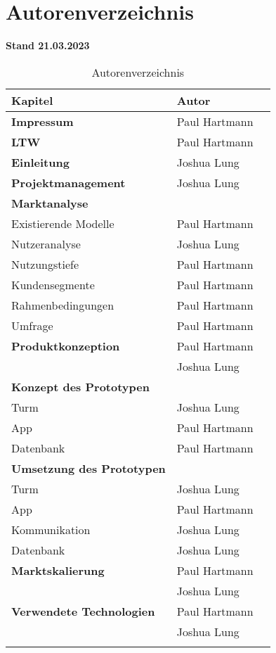 \section{Autorenverzeichnis}

\textbf{Stand 21.03.2023}

\begin{longtable}{llr}
  \textbf{Kapitel}                  & \textbf{Autor} \\
  \toprule
  \textbf{Impressum}                & Paul Hartmann  \\
  \midrule
  \textbf{LTW}                      & Paul Hartmann  \\
  \midrule
  \textbf{Einleitung}               & Joshua Lung    \\
  \midrule
  \textbf{Projektmanagement}        & Joshua Lung    \\
  \midrule
  \textbf{Marktanalyse}             &                \\
  Existierende Modelle              & Paul Hartmann  \\
  Nutzeranalyse                     & Joshua Lung    \\
  Nutzungstiefe                     & Paul Hartmann  \\
  Kundensegmente                    & Paul Hartmann  \\
  Rahmenbedingungen                 & Paul Hartmann  \\
  Umfrage                           & Paul Hartmann  \\
  \midrule
  \textbf{Produktkonzeption}        & Paul Hartmann  \\
                                    & Joshua Lung    \\
  \midrule
  \textbf{Konzept des Prototypen}   &                \\
  Turm                              & Joshua Lung    \\
  App                               & Paul Hartmann  \\
  Datenbank                         & Paul Hartmann  \\
  \midrule
  \textbf{Umsetzung des Prototypen} &                \\
  Turm                              & Joshua Lung    \\
  App                               & Paul Hartmann  \\
  Kommunikation                     & Joshua Lung    \\
  Datenbank                         & Joshua Lung    \\
  \midrule
  \textbf{Marktskalierung}          & Paul Hartmann  \\
                                    & Joshua Lung    \\
  \midrule
  \textbf{Verwendete Technologien}  & Paul Hartmann  \\
                                    & Joshua Lung    \\
  \bottomrule

  \caption{Autorenverzeichnis}
  \label{tab:autorenverzeichnis}
\end{longtable}




